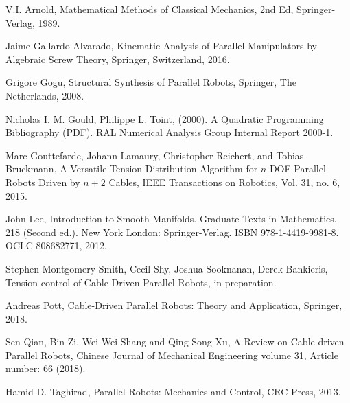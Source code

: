 \documentclass[reqno,twocolumn]{amsart}
\begin{document}
\begin{thebibliography}{99}

 V.I. Arnold, Mathematical Methods of Classical Mechanics, 2nd Ed, Springer-Verlag, 1989.

 Jaime Gallardo-Alvarado, Kinematic Analysis of Parallel Manipulators by Algebraic Screw Theory, Springer, Switzerland, 2016.

 Grigore Gogu, Structural Synthesis of Parallel Robots, Springer, The Netherlands, 2008.

 Nicholas I. M. Gould, Philippe L. Toint, (2000). A Quadratic Programming Bibliography (PDF). RAL Numerical Analysis Group Internal Report 2000-1.

 Marc Gouttefarde, Johann Lamaury, Christopher Reichert, and Tobias Bruckmann, A Versatile Tension Distribution Algorithm for $n$-DOF Parallel Robots Driven by $n + 2$ Cables, IEEE Transactions on Robotics, Vol. 31, no. 6, 2015.

 John Lee, Introduction to Smooth Manifolds. Graduate Texts in Mathematics. 218 (Second ed.). New York London: Springer-Verlag. ISBN 978-1-4419-9981-8. OCLC 808682771, 2012.

 Stephen Montgomery-Smith, Cecil Shy, Joshua Sooknanan, Derek Bankieris, Tension control of Cable-Driven Parallel Robots, in preparation.

 Andreas Pott, Cable-Driven Parallel Robots: Theory and Application, Springer, 2018.

 Sen Qian, Bin Zi, Wei-Wei Shang and Qing-Song Xu, A Review on Cable-driven Parallel Robots, Chinese Journal of Mechanical Engineering volume 31, Article number: 66 (2018).

 Hamid D. Taghirad, Parallel Robots: Mechanics and Control, CRC Press, 2013.

\end{thebibliography}
\end{document}
